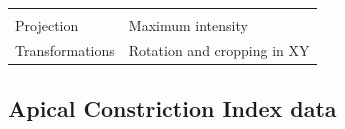 \documentclass[11pt,singlespacinge,twoside]{reedthesis} %
\begin{document}
\begin{longtable}[]{@{}ll@{}}
\begin{minipage}[t]{0.73\columnwidth}
\strut
\end{minipage}\tabularnewline
\begin{minipage}[t]{0.21\columnwidth}\raggedright
Projection\strut
\end{minipage} & \begin{minipage}[t]{0.73\columnwidth}\raggedright
Maximum intensity\strut
\end{minipage}\tabularnewline
\begin{minipage}[t]{0.21\columnwidth}\raggedright
Transformations\strut
\end{minipage} & \begin{minipage}[t]{0.73\columnwidth}\raggedright
Rotation and cropping in XY\strut
\end{minipage}\tabularnewline
\bottomrule
\end{longtable}
\hypertarget{aci-data}{%
\subsection{Apical Constriction Index data}\label{aci-data}}
\end{document}
